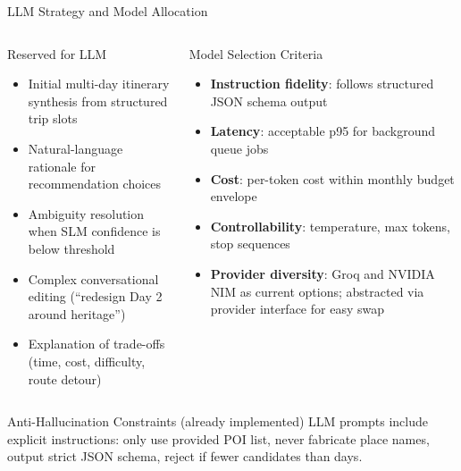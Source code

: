 \documentclass[aspectratio=169,professionalfonts]{beamer}
\newcommand{\hl}[1]{\textbf{\textcolor{ysblue}{#1}}}
\begin{document}
\begin{frame}{LLM Strategy and Model Allocation}
  \begin{columns}[T]
    \begin{block}{Reserved for LLM}
      \begin{itemize}
        \item Initial multi-day itinerary synthesis from structured trip slots
        \item Natural-language rationale for recommendation choices
        \item Ambiguity resolution when SLM confidence is below threshold
        \item Complex conversational editing (``redesign Day 2 around heritage'')
        \item Explanation of trade-offs (time, cost, difficulty, route detour)
      \end{itemize}
    \end{block}

    \begin{block}{Model Selection Criteria}
      \begin{itemize}
        \item \hl{Instruction fidelity}: follows structured JSON schema output
        \item \hl{Latency}: acceptable p95 for background queue jobs
        \item \hl{Cost}: per-token cost within monthly budget envelope
        \item \hl{Controllability}: temperature, max tokens, stop sequences
        \item \hl{Provider diversity}: Groq and NVIDIA NIM as current options;
              abstracted via provider interface for easy swap
      \end{itemize}
    \end{block}
  \end{columns}

  \vspace{0.15cm}
  \begin{exampleblock}{Anti-Hallucination Constraints (already implemented)}
    LLM prompts include explicit instructions: only use provided POI list,
    never fabricate place names, output strict JSON schema,
    reject if fewer candidates than days.
  \end{exampleblock}
\end{frame}
\end{document}
